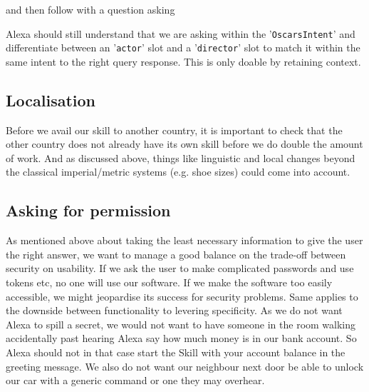 \begin{flushright}
\end{flushright}
\noindent and then follow with a question asking




\noindent Alexa should still understand that we are asking within the '\texttt{OscarsIntent}' and differentiate between an '\texttt{actor}' slot and a '\texttt{director}' slot to match it within the same intent to the right query response.
This is only doable by retaining context.


\subsection*{Localisation}
Before we avail our skill to another country, it is important to check that the other country does not already have its own skill before we do double the amount of work. And as discussed above, things like linguistic and local changes beyond the classical imperial/metric systems (e.g. shoe sizes) could come into account.

\subsection*{Asking for permission}
As mentioned above about taking the least necessary information to give the user the right answer, we want to manage a good balance on the trade-off between security on usability. If we ask the user to make complicated passwords and use tokens etc, no one will use our software. If we make the software too easily accessible, we might jeopardise its success for security problems. Same applies to the downside between functionality to levering specificity. As we do not want Alexa to spill a secret, we would not want to have someone in the room walking accidentally past hearing Alexa say how much money is in our bank account. So Alexa should not in that case start the Skill with your account balance in the greeting message. We also do not want our neighbour next door be able to unlock our car with a generic command or one they may overhear.

